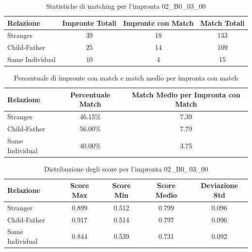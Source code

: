 \begin{table}[htbp]
\centering
\caption{Statistiche di matching per l'impronta 02\_B0\_03\_00}
\label{tab:results_02_B0_03_00}
\begin{tabular}{|l|c|c|c|}
\hline
\textbf{Relazione} & \textbf{Impronte Totali} & \textbf{Impronte con Match} & \textbf{Match Totali} \\
\hline
Stranger & 39 & 18 & 133 \\
\hline
Child-Father & 25 & 14 & 109 \\
\hline
Same Individual & 10 & 4 & 15 \\
\hline
\end{tabular}
\end{table}


\begin{table}[htbp]
\centering
\caption{Percentuale di impronte con match e match medio per impronta con match}
\label{tab:match_percentage_02_B0_03_00}
\begin{tabular}{|l|c|c|}
\hline
\textbf{Relazione} & \textbf{Percentuale Match} & \textbf{Match Medio per Impronta con Match} \\
\hline
Stranger & 46.15\% & 7.39 \\
\hline
Child-Father & 56.00\% & 7.79 \\
\hline
Same Individual & 40.00\% & 3.75 \\
\hline
\end{tabular}
\end{table}


\begin{table}[htbp]
\centering
\caption{Distribuzione degli score per l'impronta 02\_B0\_03\_00}
\label{tab:scores_02_B0_03_00}
\begin{tabular}{|l|c|c|c|c|}
\hline
\textbf{Relazione} & \textbf{Score Max} & \textbf{Score Min} & \textbf{Score Medio} & \textbf{Deviazione Std} \\
\hline
Stranger & 0.899 & 0.512 & 0.799 & 0.096 \\
\hline
Child-Father & 0.917 & 0.514 & 0.797 & 0.096 \\
\hline
Same Individual & 0.844 & 0.539 & 0.731 & 0.092 \\
\hline
\end{tabular}
\end{table}

